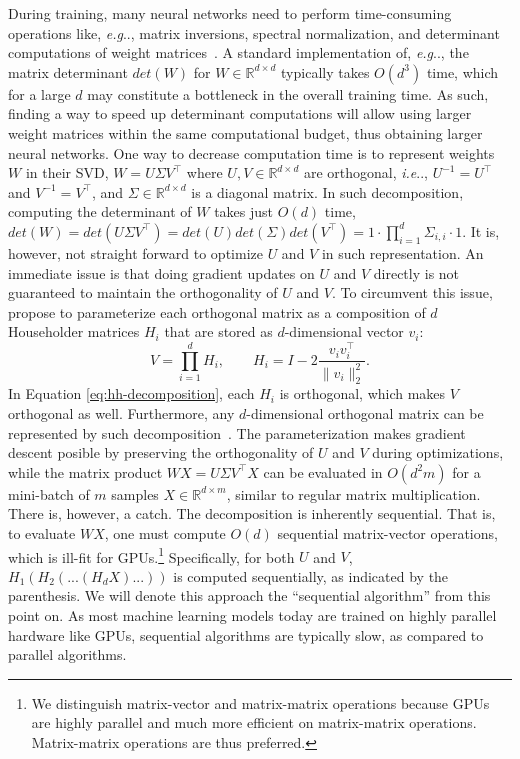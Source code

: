 \documentclass[11pt,a4paper,twoside,openright,final]{memoir}
\makeatletter
\DeclareRobustCommand\onedot{\futurelet\@let@token\@onedot}
\def\@onedot{\ifx\@let@token.\else.\null\fi\xspace}
\def\eg{\emph{e.g}\onedot} \def\Eg{\emph{E.g}\onedot}
\def\ie{\emph{i.e}\onedot} \def\Ie{\emph{I.e}\onedot}
\makeatother
\begin{document}
During training, many neural networks need to perform time-consuming operations like, \eg, matrix inversions, spectral normalization, and determinant computations of weight matrices~\cite{nice, realnvp, glow, sngan}.
A standard implementation of, \eg, the matrix determinant $det(W)$ for $W\in\mathbb{R}^{d\times d}$ typically takes $O(d^3)$ time, which for a large $d$ may constitute a bottleneck in the overall training time. 
As such, finding a way to speed up determinant computations will allow using larger weight matrices within the same computational budget, thus obtaining larger neural networks.
One way to decrease computation time is to represent weights $W$ in their SVD, $W = U\Sigma V^\intercal$ where $U, V \in \mathbb{R}^{d\times d}$ are orthogonal, \ie, $U^{-1} = U^\intercal$ and $V^{-1}= V^\intercal$, and $\Sigma\in \mathbb{R}^{d\times d}$ is a diagonal matrix. 
In such decomposition, computing the determinant of $W$ takes just $O(d)$ time, $det(W) = det(U\Sigma V^\intercal) = det(U)det(\Sigma)det(V^\intercal) = 1\cdot \prod_{i=1}^d \Sigma_{i,i} \cdot 1$.
It is, however, not straight forward to optimize $U$ and $V$ in such representation.
An immediate issue is that doing gradient updates on $U$ and $V$ directly is not guaranteed to maintain the orthogonality of $U$ and $V$.
To circumvent this issue, \citet{sequential} propose to parameterize each orthogonal matrix as a composition of $d$ Householder matrices $H_i$ that are stored as $d$-dimensional vector $v_i$:
\begin{equation}\label{eq:hh-decomposition}
    V = \prod_{i=1}^d H_i, \qquad H_i = I - 2\frac{v_i v_i^\intercal}{\| v_i \|_2^2}.
\end{equation}
In Equation \ref{eq:hh-decomposition}, each $H_i$ is orthogonal, which makes $V$ orthogonal as well. 
Furthermore, any $d$-dimensional orthogonal matrix can be represented by such decomposition~\cite{uhlig2001constructive}. 
The parameterization makes gradient descent posible by preserving the orthogonality of $U$ and $V$ during optimizations, while the matrix product $WX = U \Sigma V^\intercal X$ can be evaluated in $O(d^2m)$ for a mini-batch of $m$ samples $X\in\mathbb{R}^{d\times m}$, similar to regular matrix multiplication. 
There is, however, a catch.
The decomposition is inherently sequential. 
That is, to evaluate $WX$, one must compute $O(d)$ sequential matrix-vector operations, which is ill-fit for GPUs.\footnote{We distinguish matrix-vector and matrix-matrix operations because GPUs are highly parallel and much more efficient on matrix-matrix operations. Matrix-matrix operations are thus preferred.}
Specifically, for both $U$ and $V$, $H_1(H_2(...(H_dX) ...))$ is computed sequentially, as indicated by the parenthesis.
We will denote this approach the ``sequential algorithm'' from this point on.
As most machine learning models today are trained on highly parallel hardware like GPUs, sequential algorithms are typically slow, as compared to parallel algorithms.
\end{document}
